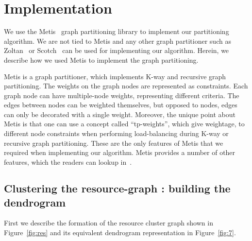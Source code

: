 \section{Implementation}
\label{sec:imple}

\begin{figure*}[t!]
  \centering
  \scalebox{0.4}{}
  \caption{The dendrogram for Figure~\ref{fig:res}}
  \label{fig:7}
\end{figure*}

We use the Metis~\cite{gkar95} graph partitioning library to implement
our partitioning algorithm. We are not tied to Metis and any other graph
partitioner such as Zoltan~\cite{kdev09} or Scotch~\cite{cche08} can be
used for implementing our algorithm. Herein, we describe how we used
Metis to implement the graph partitioning.

Metis is a graph partitioner, which implements K-way and recursive graph
partitioning. The weights on the graph nodes are represented as
constraints. Each graph node can have multiple-node weights,
representing different criteria. The edges between nodes can be weighted
themselves, but opposed to nodes, edges can only be decorated with a
single weight. Moreover, the unique point about Metis is that one can
use a concept called ``tp-weights'', which give weightage, to different
node constraints when performing load-balancing during K-way or
recursive graph partitioning. These are the only features of Metis that
we required when implementing our algorithm. Metis provides a number of
other features, which the readers can lookup in~\cite{gkar95}.

\subsection{Clustering the resource-graph : building the dendrogram}
\label{sec:clust-reso-graph}

First we describe the formation of the resource cluster graph shown in
Figure~\ref{fig:res} and its equivalent dendrogram representation in
Figure~\ref{fig:7}.

